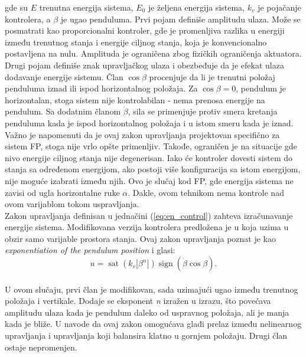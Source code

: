\documentclass[a4paper,11pt]{article}
\theoremstyle{definition} \newtheorem{deff}{Definicija}[section]
\theoremstyle{definition} \newtheorem{prim}[deff]{Primer}
\theoremstyle{plain} \newtheorem{teor}[deff]{Teorema}
\begin{document}
	
	gde su $\textit{E}$ trenutna energija sistema, 
	$\textit{E}_0$ je željena energija sistema, $\textit{k}_v$ je pojačanje kontrolera, a $\beta$ je ugao penduluma. Prvi pojam definiše amplitudu ulaza. Može se posmatrati kao proporcionalni kontroler, gde je promenljiva razlika u energiji između trenutnog stanja i energije ciljnog stanja, koja je konvencionalno postavljena na nulu. Amplituda je ograničena zbog fizičkih ograničenja aktuatora. Drugi pojam definiše znak upravljačkog ulaza i obezbeđuje da je efekat ulaza dodavanje energije sistemu. Član $\cos \beta$ procenjuje da li je trenutni položaj penduluma iznad ili ispod horizontalnog položaja. Za $\cos \beta = 0$, pendulum je horizontalan, stoga sistem nije kontrolabilan - nema prenosa energije na pendulum. Sa dodatnim članom $\dot{\beta}$, sila se primenjuje protiv smera kretanja penduluma kada je ispod horizontalnog položaja i u istom smeru kada je iznad.\\
	
	Važno je napomenuti da je ovaj zakon upravljanja projektovan specifično za sistem FP, stoga nije vrlo opšte primenljiv. Takođe, ograničen je na situacije gde nivo energije ciljnog stanja nije degenerisan. Iako će kontroler dovesti sistem do stanja sa određenom energijom, ako postoji više konfiguracija sa istom energijom, nije moguće izabrati između njih. Ovo je slučaj kod FP, gde energija sistema ne zavisi od ugla horizontalne ruke $\alpha$. Dakle, ovom tehnikom nema kontrole nad ovom varijablom tokom uspravljanja. \\
	
	Zakon upravljanja definisan u jednačini (\ref{eq:en_control}) zahteva izračunavanje energije sistema. Modifikovana verzija kontrolera predložena je u \cite{energy_c} koja uzima u obzir samo varijable prostora stanja. Ovaj zakon upravljanja poznat je kao 
	\textit{exponentiation of the pendulum position} i glasi:\\
	
	\begin{equation}
		u = \operatorname{sat}(k_v |\beta^n|) \operatorname{sign}( \dot{\beta} \cos \beta).
	\end{equation} \\
	
	U ovom slučaju, prvi član je modifikovan, sada uzimajući ugao između trenutnog položaja i vertikale.
	Dodaje se eksponent \textit{n} izražen u izrazu, što povećava amplitudu ulaza kada je pendulum daleko od uspravnog položaja, ali je manja kada je bliže. U \cite{inicijalna} navode da ovaj zakon omogućava glađi prelaz između nelinearnog upravljanja i upravljanja koji balansira klatno u gornjem položaju. Drugi član ostaje nepromenjen. \\
	
\end{document}
